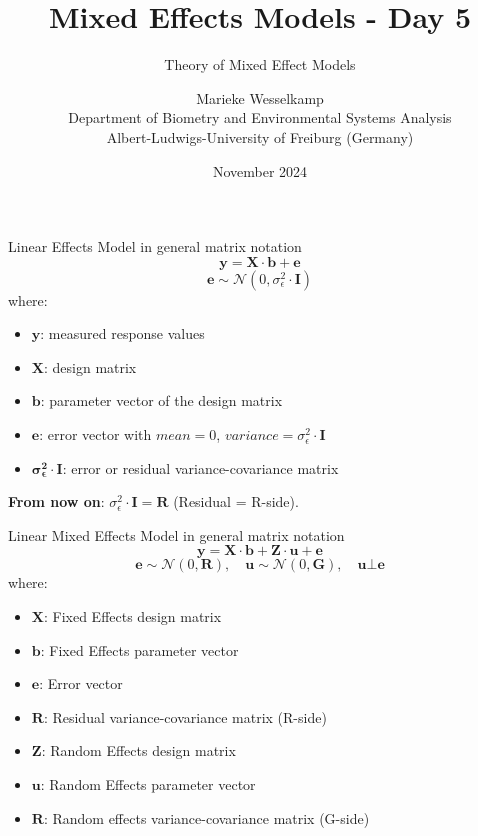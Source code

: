 \documentclass{beamer}
\title{Mixed Effects Models - Day 5}
\subtitle{Theory of Mixed Effect Models}
\author{Marieke Wesselkamp \\ Department of Biometry and Environmental Systems Analysis \\
Albert-Ludwigs-University of Freiburg (Germany)}
\date{November 2024}
\begin{document}
\frame{\titlepage}


\begin{frame}{Linear Effects Model in general matrix notation}
\[
\mathbf{y} = \mathbf{X} \cdot \mathbf{b} + \mathbf{e}
\]
\[
\mathbf{e} \sim \mathcal{N}(0, \sigma^2_{\epsilon} \cdot \mathbf{I})
\]
where:
\begin{itemize}
  \item $\mathbf{y}$: measured response values
  \item $\mathbf{X}$: design matrix
  \item $\mathbf{b}$: parameter vector of the design matrix
  \item $\mathbf{e}$: error vector with $mean = 0$, $variance = \sigma^2_{\epsilon} \cdot \mathbf{I}$
  \item $\mathbf{\sigma^2_{\epsilon} \cdot \mathbf{I}}$: error or residual variance-covariance matrix
\end{itemize}
\vspace{0.5cm}

\pause

\textbf{From now on}: $\sigma^2_{\epsilon} \cdot \mathbf{I} = \mathbf{R}$ (Residual = R-side).

\end{frame}

\begin{frame}{Linear Mixed Effects Model in general matrix notation}
\[
\mathbf{y} = \mathbf{X} \cdot \mathbf{b} + \mathbf{Z} \cdot \mathbf{u} + \mathbf{e}
\]
\[
\mathbf{e} \sim \mathcal{N}(0, \mathbf{R}), \quad \mathbf{u} \sim \mathcal{N}(0, \mathbf{G}), \quad \mathbf{u} \bot \mathbf{e}
\]
where:
\begin{itemize}
  \item $\mathbf{X}$: Fixed Effects design matrix
  \item $\mathbf{b}$: Fixed Effects parameter vector
  \item $\mathbf{e}$: Error vector
  \item $\mathbf{R}$: Residual variance-covariance matrix (R-side)
  \pause
  \item $\mathbf{Z}$: Random Effects design matrix
  \item $\mathbf{u}$: Random Effects parameter vector
  \item $\mathbf{R}$: Random effects variance-covariance matrix (G-side)
\end{itemize}
\end{frame}
\end{document}
